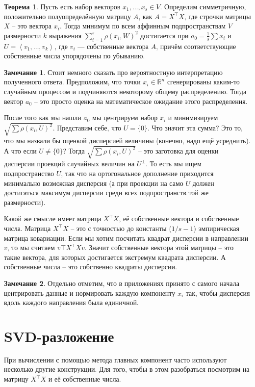\documentclass[10pt,a4paper,oneside]{book}
\theoremstyle{definition}
\newtheorem*{rem}{\color{green!50!blue}Замечание}
\newtheorem{thm}{\color{red!40!black}Теорема}
\newcommand{\mb}[1]{\mathbb{#1}}
\def\lan{\left\langle }
\def\ran{\right\rangle}
\def\thrm{\begin{thm}}
\def\ethrm{\end{thm}}
\def\rm{\begin{rem}}
\def\erm{\end{rem}}
\begin{document}
\thrm  Пусть есть набор векторов $x_1,\dots,x_s \in V$. Определим симметричную, положительно полуопределённую матрицу $A$, как $A=X^{\top}X$, где строчки матрицы $X$ -- это вектора $x_i$. Тогда минимум по всем аффинным подпространствам $V$ размерности $k$ выражения $\sum_{i=1}^s \rho(x_i,W)^2$ достигается при $a_0=\frac{1}{s}\sum x_i$  и $U=\lan v_1,\dots,v_k\ran$, где $v_i$ --- собственные вектора $A$, причём соответствующие собственные числа упорядочены по убыванию. 
\ethrm

\rm Стоит немного сказать про вероятностную интерпретацию полученного ответа. Предположим, что точки $x_i\in \mb R^n$ сгенерированы каким-то случайным процессом и подчиняются некоторому общему распределению. Тогда вектор $a_0$ -- это просто оценка на математическое ожидание этого распределения.

После того как мы нашли $a_0$ мы центрируем набор $x_i$ и минимизируем $\sqrt{\sum \rho (x_i, U)^2}$. Представим себе, что $U=\{0\}$. Что значит эта сумма? Это то, что мы назвали бы оценкой дисперсией величины (конечно, надо ещё усреднить). 
А что если $U \neq \{0\}$? Тогда $\sqrt{\sum \rho (x_i, U)^2}$ -- это заготовка для оценки дисперсии проекций случайных величин на $U^\bot$. То есть мы ищем подпространство $U$, так что на ортогональное дополнение приходится минимально возможная дисперсия (а при проекции на само $U$ должен достигаться максимум дисперсии среди всех подпространств той же размерности).

Какой же смысле имеет матрица $X^\top X$, её собственные вектора и собственные числа. Матрица $X^\top X$ -- это с точностью до константы ($1/s-1$) эмпирическая матрица ковариации. Если мы хотим посчитать квадрат дисперсии в направлении $v$, то мы считаем $v\top X^\top X v$. Значит собственные вектора этой матрицы -- это такие вектора, для которых достигается экстремум квадрата дисперсии. А собственные числа -- это собственно квадраты дисперсии.
\erm

\rm Отдельно отметим, что в приложениях принято с самого начала центрировать данные и нормировать каждую компоненту $x_i$ так, чтобы дисперсия вдоль каждого направления была единичной.
\erm



\section{SVD-разложение}

При вычислении с помощью метода главных компонент часто используют несколько другие конструкции. Для того, чтобы в этом разобраться посмотрим на матрицу  $X^{\top}X$  и её собственные числа.  
\end{document}
